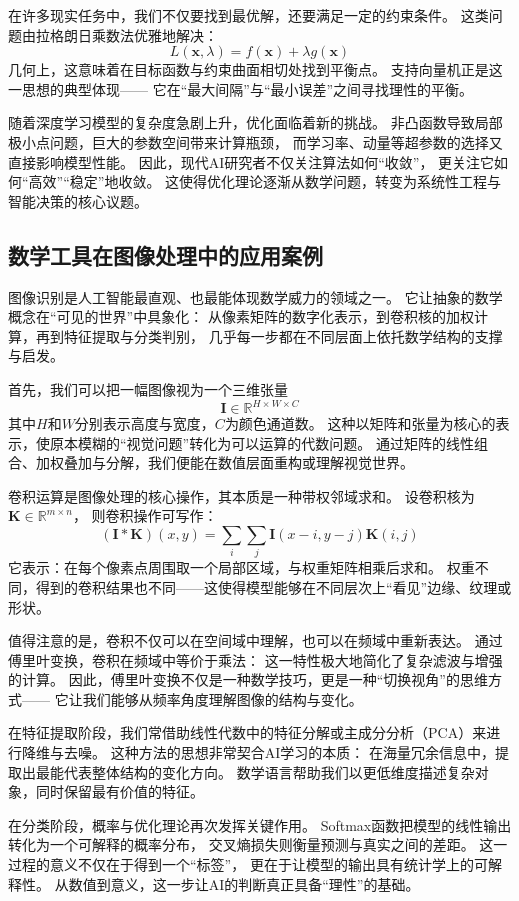 在许多现实任务中，我们不仅要找到最优解，还要满足一定的约束条件。  
这类问题由拉格朗日乘数法优雅地解决：
$$L(\mathbf{x}, \lambda) = f(\mathbf{x}) + \lambda g(\mathbf{x})$$  
几何上，这意味着在目标函数与约束曲面相切处找到平衡点。  
支持向量机正是这一思想的典型体现——  
它在“最大间隔”与“最小误差”之间寻找理性的平衡。

随着深度学习模型的复杂度急剧上升，优化面临着新的挑战。  
非凸函数导致局部极小点问题，巨大的参数空间带来计算瓶颈，  
而学习率、动量等超参数的选择又直接影响模型性能。  
因此，现代AI研究者不仅关注算法如何“收敛”，  
更关注它如何“高效”“稳定”地收敛。  
这使得优化理论逐渐从数学问题，转变为系统性工程与智能决策的核心议题。

\subsection{数学工具在图像处理中的应用案例}

图像识别是人工智能最直观、也最能体现数学威力的领域之一。  
它让抽象的数学概念在“可见的世界”中具象化：  
从像素矩阵的数字化表示，到卷积核的加权计算，再到特征提取与分类判别，  
几乎每一步都在不同层面上依托数学结构的支撑与启发。

首先，我们可以把一幅图像视为一个三维张量  
$$\mathbf{I} \in \mathbb{R}^{H \times W \times C}$$  
其中$H$和$W$分别表示高度与宽度，$C$为颜色通道数。  
这种以矩阵和张量为核心的表示，使原本模糊的“视觉问题”转化为可以运算的代数问题。  
通过矩阵的线性组合、加权叠加与分解，我们便能在数值层面重构或理解视觉世界。

卷积运算是图像处理的核心操作，其本质是一种带权邻域求和。  
设卷积核为$\mathbf{K} \in \mathbb{R}^{m \times n}$，  
则卷积操作可写作：
$$
(\mathbf{I} * \mathbf{K})(x, y) = \sum_i \sum_j \mathbf{I}(x-i, y-j)\mathbf{K}(i, j)
$$  
它表示：在每个像素点周围取一个局部区域，与权重矩阵相乘后求和。  
权重不同，得到的卷积结果也不同——这使得模型能够在不同层次上“看见”边缘、纹理或形状。

值得注意的是，卷积不仅可以在空间域中理解，也可以在频域中重新表达。  
通过傅里叶变换，卷积在频域中等价于乘法：  
这一特性极大地简化了复杂滤波与增强的计算。  
因此，傅里叶变换不仅是一种数学技巧，更是一种“切换视角”的思维方式——  
它让我们能够从频率角度理解图像的结构与变化。

在特征提取阶段，我们常借助线性代数中的特征分解或主成分分析（PCA）来进行降维与去噪。  
这种方法的思想非常契合AI学习的本质：  
在海量冗余信息中，提取出最能代表整体结构的变化方向。  
数学语言帮助我们以更低维度描述复杂对象，同时保留最有价值的特征。

在分类阶段，概率与优化理论再次发挥关键作用。  
Softmax函数把模型的线性输出转化为一个可解释的概率分布，  
交叉熵损失则衡量预测与真实之间的差距。  
这一过程的意义不仅在于得到一个“标签”，  
更在于让模型的输出具有统计学上的可解释性。  
从数值到意义，这一步让AI的判断真正具备“理性”的基础。


